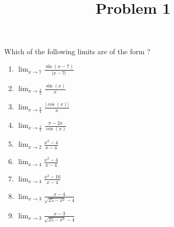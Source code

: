 \documentclass{ximera}
\title[Problem 1]{Problem 1}
\begin{document}
\begin{abstract} \end{abstract}
\maketitle

\begin{problem}
	Which of the following limits are of the form \ZeroOverZero?	
	\begin{enumerate}
		\item $\displaystyle \lim_{x \to 7} \frac{\sin{(x-7)}}{|x-7|}  $
		\item $\displaystyle \lim_{x \to \frac{\pi}{2}} \frac{\sin{(x)}}{x}  $
		\item $\displaystyle \lim_{x \to \frac{\pi}{2}} \frac{|\cos{(x)}|}{x}  $
		\item $\displaystyle \lim_{x \to \frac{\pi}{2}} \frac{\pi-2x}{\cos{(x)}}$
		\item	$\displaystyle\lim_{x \to 2} \frac{x^2 - 4}{x-4} $\\
		\item	$\displaystyle\lim_{x \to 4} \frac{x^2 - 4}{x-4} $\\
		\item	$\displaystyle\lim_{x \to 4} \frac{x^2 - 16}{x-4} $\\
		\item	$\displaystyle\lim_{x \to 3} \frac{x-4}{\sqrt{25-x^2 }-4} $\\
		\item	$\displaystyle\lim_{x \to 3} \frac{x-3}{\sqrt{25-x^2 }-4} $\\
	\end{enumerate}
\end{problem}
\end{document}
